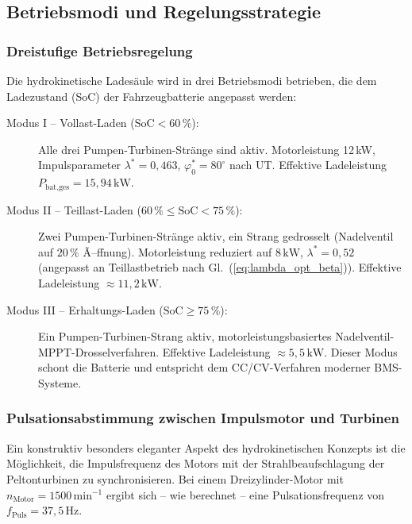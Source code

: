 ﻿\documentclass[a4paper,12pt]{article}
\begin{document}
\subsection{Betriebsmodi und Regelungsstrategie}

\subsubsection{Dreistufige Betriebsregelung}

Die hydrokinetische Ladesäule wird in drei Betriebsmodi betrieben, die
dem Ladezustand (SoC) der Fahrzeugbatterie angepasst werden:

\begin{description}
  \item[Modus I -- Vollast-Laden ($\text{SoC} < 60\,\%$):] Alle drei
    Pumpen-Turbinen-Stränge sind aktiv. Motorleistung 12\,kW,
    Impulsparameter $\lambda^* = 0{,}463$, $\varphi_0^* = 80^\circ$
    nach UT. Effektive Ladeleistung $P_\text{bat,ges} = 15{,}94\,\text{kW}$.
  \item[Modus II -- Teillast-Laden ($60\,\% \leq \text{SoC} < 75\,\%$):]
    Zwei Pumpen-Turbinen-Stränge aktiv, ein Strang gedrosselt (Nadelventil
    auf $20\,\%$ Ã–ffnung). Motorleistung reduziert auf $8\,\text{kW}$,
    $\lambda^* = 0{,}52$ (angepasst an Teillastbetrieb nach
    Gl.~(\ref{eq:lambda_opt_beta})). Effektive Ladeleistung
    $\approx 11{,}2\,\text{kW}$.
  \item[Modus III -- Erhaltungs-Laden ($\text{SoC} \geq 75\,\%$):]
    Ein Pumpen-Turbinen-Strang aktiv, motorleistungsbasiertes Nadelventil-
    MPPT-Drosselverfahren. Effektive Ladeleistung $\approx 5{,}5\,\text{kW}$.
    Dieser Modus schont die Batterie und entspricht dem CC/CV-Verfahren
    moderner BMS-Systeme.
\end{description}

\subsubsection{Pulsationsabstimmung zwischen Impulsmotor und Turbinen}

Ein konstruktiv besonders eleganter Aspekt des hydrokinetischen Konzepts
ist die Möglichkeit, die Impulsfrequenz des Motors mit der Strahlbeaufschlagung
der Peltonturbinen zu synchronisieren. Bei einem Dreizylinder-Motor mit
$n_\text{Motor} = 1500\,\text{min}^{-1}$ ergibt sich -- wie berechnet --
eine Pulsationsfrequenz von $f_\text{Puls} = 37{,}5\,\text{Hz}$.
\end{document}
